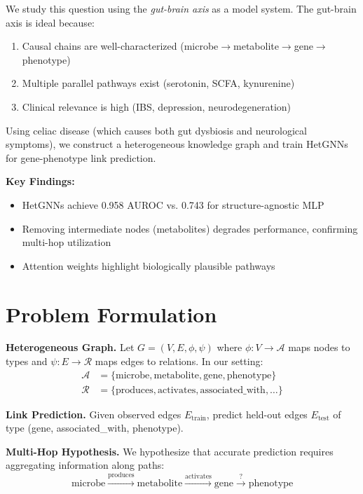 \documentclass{article}
\begin{document}
We study this question using the \textit{gut-brain axis} as a model system. The gut-brain axis is ideal because:
\begin{enumerate}
    \item Causal chains are well-characterized (microbe$\rightarrow$metabolite$\rightarrow$gene$\rightarrow$phenotype)
    \item Multiple parallel pathways exist (serotonin, SCFA, kynurenine)
    \item Clinical relevance is high (IBS, depression, neurodegeneration)
\end{enumerate}

Using celiac disease (which causes both gut dysbiosis and neurological symptoms), we construct a heterogeneous knowledge graph and train HetGNNs for gene-phenotype link prediction.

\textbf{Key Findings:}
\begin{itemize}
    \item HetGNNs achieve 0.958 AUROC vs. 0.743 for structure-agnostic MLP
    \item Removing intermediate nodes (metabolites) degrades performance, confirming multi-hop utilization
    \item Attention weights highlight biologically plausible pathways
\end{itemize}

\section{Problem Formulation}

\textbf{Heterogeneous Graph.} Let $G = (V, E, \phi, \psi)$ where $\phi: V \rightarrow \mathcal{A}$ maps nodes to types and $\psi: E \rightarrow \mathcal{R}$ maps edges to relations. In our setting:
\begin{align}
    \mathcal{A} &= \{\text{microbe}, \text{metabolite}, \text{gene}, \text{phenotype}\} \\
    \mathcal{R} &= \{\text{produces}, \text{activates}, \text{associated\_with}, \ldots\}
\end{align}

\textbf{Link Prediction.} Given observed edges $E_{\text{train}}$, predict held-out edges $E_{\text{test}}$ of type (gene, associated\_with, phenotype).

\textbf{Multi-Hop Hypothesis.} We hypothesize that accurate prediction requires aggregating information along paths:
\begin{equation}
    \text{microbe} \xrightarrow{\text{produces}} \text{metabolite} \xrightarrow{\text{activates}} \text{gene} \xrightarrow{\text{?}} \text{phenotype}
\end{equation}
\end{document}
